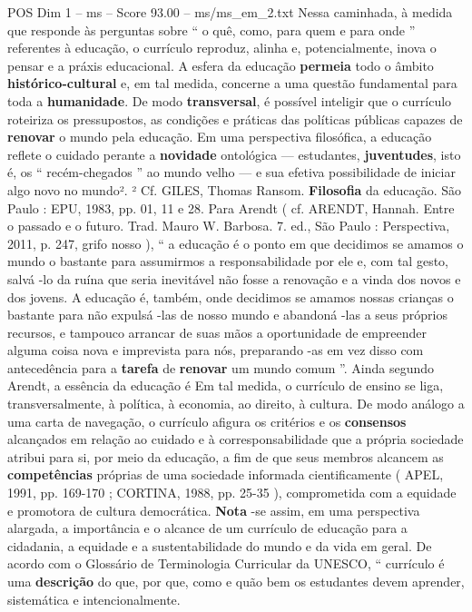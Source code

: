\begin{textsample}{POS Dim 1 – ms – Score 93.00 – ms/ms\_em\_2.txt}
Nessa caminhada, à medida que responde às perguntas sobre “ o quê, como, para quem e para onde ” referentes à educação, o currículo reproduz, alinha e, potencialmente, inova o pensar e a práxis educacional.
A esfera da educação \textbf{permeia} todo o âmbito \textbf{histórico-cultural} e, em tal medida, concerne a uma questão fundamental para toda a \textbf{humanidade}.
De modo \textbf{transversal}, é possível inteligir que o currículo roteiriza os pressupostos, as condições e práticas das políticas públicas capazes de \textbf{renovar} o mundo pela educação.
Em uma perspectiva filosófica, a educação reflete o cuidado perante a \textbf{novidade} ontológica — estudantes, \textbf{juventudes}, isto é, os “ recém-chegados ” ao mundo velho — e sua efetiva possibilidade de iniciar algo novo no mundo². ² Cf.
GILES, Thomas Ransom. \textbf{Filosofia} da educação.
São Paulo : EPU, 1983, pp. 01, 11 e 28.
Para Arendt ( cf.
ARENDT, Hannah.
Entre o passado e o futuro.
Trad.
Mauro W.
Barbosa. 7. ed., São Paulo : Perspectiva, 2011, p. 247, grifo nosso ), “ a educação é o ponto em que decidimos se amamos o mundo o bastante para assumirmos a responsabilidade por ele e, com tal gesto, salvá -lo da ruína que seria inevitável não fosse a renovação e a vinda dos novos e dos jovens.
A educação é, também, onde decidimos se amamos nossas crianças o bastante para não expulsá -las de nosso mundo e abandoná -las a seus próprios recursos, e tampouco arrancar de suas mãos a oportunidade de empreender alguma coisa nova e imprevista para nós, preparando -as em vez disso com antecedência para a \textbf{tarefa} de \textbf{renovar} um mundo comum ”.
Ainda segundo Arendt, a essência da educação é Em tal medida, o currículo de ensino se liga, transversalmente, à política, à economia, ao direito, à cultura.
De modo análogo a uma carta de navegação, o currículo afigura os critérios e os \textbf{consensos} alcançados em relação ao cuidado e à corresponsabilidade que a própria sociedade atribui para si, por meio da educação, a fim de que seus membros alcancem as \textbf{competências} próprias de uma sociedade informada cientificamente ( APEL, 1991, pp. 169-170 ; CORTINA, 1988, pp. 25-35 ), comprometida com a equidade e promotora de cultura democrática. \textbf{Nota} -se assim, em uma perspectiva alargada, a importância e o alcance de um currículo de educação para a cidadania, a equidade e a sustentabilidade do mundo e da vida em geral.
De acordo com o Glossário de Terminologia Curricular da UNESCO, “ currículo é uma \textbf{descrição} do que, por que, como e quão bem os estudantes devem aprender, sistemática e intencionalmente.

\end{textsample}
